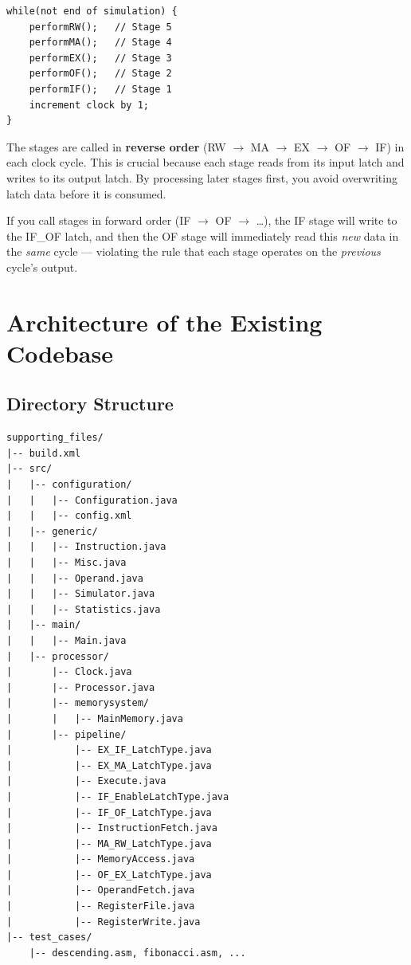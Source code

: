 \documentclass[12pt,a4paper]{article}
\begin{document}
\begin{lstlisting}[style=javastyle, caption={Target pipelined simulation loop}]
while(not end of simulation) {
    performRW();   // Stage 5
    performMA();   // Stage 4
    performEX();   // Stage 3
    performOF();   // Stage 2
    performIF();   // Stage 1
    increment clock by 1;
}
\end{lstlisting}

\begin{keypoint}
The stages are called in \textbf{reverse order} (RW $\rightarrow$ MA $\rightarrow$ EX $\rightarrow$ OF $\rightarrow$ IF) in each clock cycle. This is crucial because each stage reads from its input latch and writes to its output latch. By processing later stages first, you avoid overwriting latch data before it is consumed.
\end{keypoint}

\begin{warningbox}
If you call stages in forward order (IF $\rightarrow$ OF $\rightarrow$ \ldots), the IF stage will write to the IF\_OF latch, and then the OF stage will immediately read this \textit{new} data in the \textit{same} cycle --- violating the rule that each stage operates on the \textit{previous} cycle's output.
\end{warningbox}

\section{Architecture of the Existing Codebase}

\subsection{Directory Structure}

\begin{lstlisting}[style=asmstyle, caption={Project directory layout}]
supporting_files/
|-- build.xml
|-- src/
|   |-- configuration/
|   |   |-- Configuration.java
|   |   |-- config.xml
|   |-- generic/
|   |   |-- Instruction.java
|   |   |-- Misc.java
|   |   |-- Operand.java
|   |   |-- Simulator.java
|   |   |-- Statistics.java
|   |-- main/
|   |   |-- Main.java
|   |-- processor/
|       |-- Clock.java
|       |-- Processor.java
|       |-- memorysystem/
|       |   |-- MainMemory.java
|       |-- pipeline/
|           |-- EX_IF_LatchType.java
|           |-- EX_MA_LatchType.java
|           |-- Execute.java
|           |-- IF_EnableLatchType.java
|           |-- IF_OF_LatchType.java
|           |-- InstructionFetch.java
|           |-- MA_RW_LatchType.java
|           |-- MemoryAccess.java
|           |-- OF_EX_LatchType.java
|           |-- OperandFetch.java
|           |-- RegisterFile.java
|           |-- RegisterWrite.java
|-- test_cases/
    |-- descending.asm, fibonacci.asm, ...
\end{lstlisting}
\end{document}
